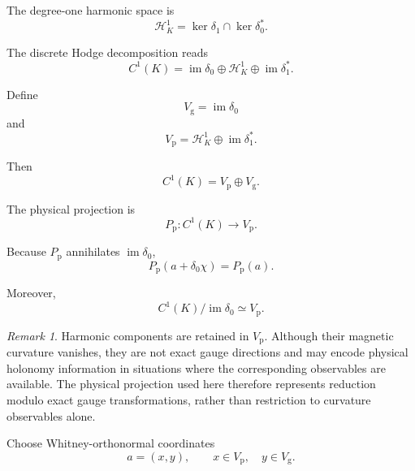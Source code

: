 \documentclass[11pt]{article}
\theoremstyle{remark}
\newtheorem{remark}[theorem]{Remark}
\newcommand{\im}{\operatorname{im}}
\newcommand{\Ker}{\operatorname{ker}}
\begin{document}
The degree-one harmonic space is
\begin{equation}
\mathcal H_K^1
=
\Ker\delta_1
\cap
\Ker\delta_0^\ast.
\label{eq:harmonic}
\end{equation}

The discrete Hodge decomposition reads
\begin{equation}
C^1(K)
=
\im\delta_0
\oplus
\mathcal H_K^1
\oplus
\im\delta_1^\ast.
\label{eq:hodge}
\end{equation}

Define
\begin{equation}
V_{\mathrm g}
=
\im\delta_0
\label{eq:gauge-sector}
\end{equation}
and
\begin{equation}
V_{\mathrm p}
=
\mathcal H_K^1
\oplus
\im\delta_1^\ast.
\label{eq:physical-sector}
\end{equation}

Then
\begin{equation}
C^1(K)
=
V_{\mathrm p}\oplus V_{\mathrm g}.
\label{eq:orthogonal-splitting}
\end{equation}

The physical projection is
\begin{equation}
P_{\mathrm p}:
C^1(K)\longrightarrow V_{\mathrm p}.
\label{eq:projection}
\end{equation}

Because \(P_{\mathrm p}\) annihilates
\(\im\delta_0\),
\begin{equation}
P_{\mathrm p}(a+\delta_0\chi)
=
P_{\mathrm p}(a).
\label{eq:projection-gauge}
\end{equation}

Moreover,
\begin{equation}
C^1(K)/\im\delta_0
\simeq
V_{\mathrm p}.
\label{eq:quotient}
\end{equation}

\begin{remark}
Harmonic components are retained in \(V_{\mathrm p}\). Although
their magnetic curvature vanishes, they are not exact gauge
directions and may encode physical holonomy information in
situations where the corresponding observables are available.
The physical projection used here therefore represents reduction
modulo exact gauge transformations, rather than restriction to
curvature observables alone.
\end{remark}

Choose Whitney-orthonormal coordinates
\begin{equation}
a=(x,y),
\qquad
x\in V_{\mathrm p},
\quad
y\in V_{\mathrm g}.
\label{eq:coordinates}
\end{equation}
\end{document}
